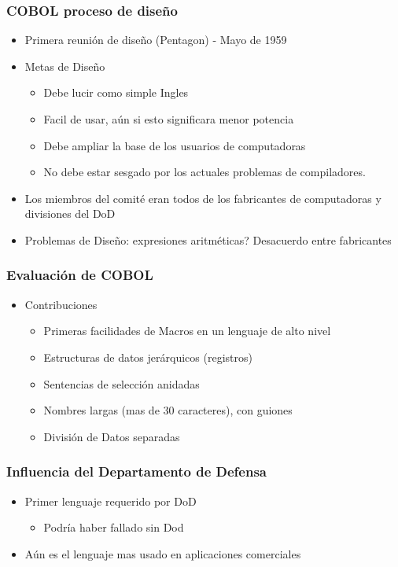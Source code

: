\documentclass[11pt]{article}
\begin{document}
\subsubsection*{COBOL proceso de diseño}
\label{sec:orgheadline65}
\begin{itemize}
\item Primera reunión de diseño (Pentagon) - Mayo de 1959
\item Metas de Diseño
\begin{itemize}
\item Debe lucir como simple Ingles
\item Facil de usar, aún si esto significara menor potencia
\item Debe ampliar la base de los usuarios de computadoras
\item No debe estar sesgado por los actuales problemas de compiladores.
\end{itemize}
\item Los miembros del comité eran todos de los fabricantes de
computadoras y divisiones del DoD
\item Problemas de Diseño: expresiones aritméticas? Desacuerdo entre fabricantes
\end{itemize}

\subsubsection*{Evaluación de COBOL}
\label{sec:orgheadline66}
\begin{itemize}
\item Contribuciones
\begin{itemize}
\item Primeras facilidades de Macros en un lenguaje de alto nivel
\item Estructuras de datos jerárquicos (registros)
\item Sentencias de selección anidadas
\item Nombres largas (mas de 30 caracteres), con guiones
\item División de Datos separadas
\end{itemize}
\end{itemize}

\subsubsection*{Influencia del Departamento de Defensa}
\label{sec:orgheadline67}
\begin{itemize}
\item Primer lenguaje requerido por DoD
\begin{itemize}
\item Podría haber fallado sin Dod
\end{itemize}
\item Aún es el lenguaje mas usado en aplicaciones comerciales
\end{itemize}
\end{document}
